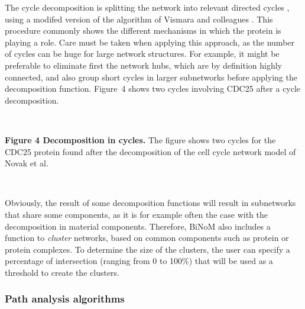 \documentclass[11pt]{bmc_article_s50}
\newenvironment{bmcformat}{\begin{raggedright}\baselineskip20pt\sloppy\setboolean{publ}{false}}{\end{raggedright}\baselineskip20pt\sloppy}
\begin{document}
\begin{bmcformat}
The cycle decomposition is splitting the network into relevant directed cycles
\cite{gleiss2001relevant}, using a modifed version of the algorithm of Vismara
and colleagues \cite{vismara1997union}. This procedure commonly shows the
different mechanisms in which the protein is playing a role. Care must
be taken when applying this approach, as the number of cycles can be huge for
large network structures. For example, it might be preferable to eliminate first
the network hubs, which are by definition highly connected, and also group short
cycles in larger subnetworks before applying the decomposition function.
Figure~4 shows two
cycles involving CDC25 after a cycle decomposition.

\hrulefill\

\vspace*{-13pt}
\textbf{Figure 4 Decomposition in cycles.}
The figure shows two cycles for the CDC25 protein found after the decomposition of the cell cycle network model of Novak et al. \cite{novak1998model}

\vspace*{-21pt}

\hrulefill\

Obviously, the result of some decomposition functions will result in subnetworks
that share some components, as it is for example often the case
with the decomposition in material components. Therefore, BiNoM also includes a
function to \emph{cluster} networks, based on common components such as protein
or protein complexes. To determine the size of the clusters, the user can
specify a percentage of intersection (ranging from 0 to 100\%) that will be used
as a threshold to create the clusters.


\subsubsection*{Path analysis algorithms}


\end{bmcformat}
\end{document}
